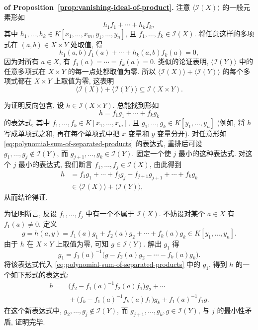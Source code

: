 \begin{Proof}\textbf{of Proposition~\ref{prop:vanishing-ideal-of-product}.}\quad
注意 $\langle\mathcal{I}(X)\rangle$ 的一般元素形如
\[
  h_{1}f_{1}+\cdots+h_{k}f_{k},
\]
其中 $h_{1},\ldots,h_{k}\in K[x_{1},\ldots,x_{m},y_{1},\ldots,y_{n}]$, 且 $f_{1},\ldots,f_{k}\in\mathcal{I}(X)$. 将任意这样的多项式在 $(a,b)\in X\times Y$ 处取值, 得
\[
  h_{1}(a,b)f_{1}(a)+\cdots+h_{k}(a,b)f_{k}(a)=0,
\]
因为对所有 $a\in X$, 有 $f_{1}(a)=\cdots=f_{k}(a)=0$. 类似的论证表明, $\langle\mathcal{I}(Y)\rangle$ 中的任意多项式在 $X\times Y$ 的每一点处都取值为零. 所以 $\langle\mathcal{I}(X)\rangle+\langle\mathcal{I}(Y)\rangle$ 的每个多项式都在 $X\times Y$ 上取值为零, 这表明
\[
  \langle\mathcal{I}(X)\rangle+\langle\mathcal{I}(Y)\rangle\subseteq\mathcal{I}(X\times Y).
\]

为证明反向包含, 设 $h\in\mathcal{I}(X\times Y)$. 总能找到形如
\begin{equation}\label{eq:polynomial-sum-of-separated-products}
  h=f_{1}g_{1}+\cdots+f_{k}g_{k}
\end{equation}
的表达式, 其中 $f_{1},\ldots,f_{k}\in K[x_{1},\ldots,x_{m}]$, 且 $g_{1},\ldots,g_{k}\in K[y_{1},\ldots,y_{n}]$ (例如, 将 $h$ 写成单项式之和, 再在每个单项式中把 $x$ 变量和 $y$ 变量分开). 对任意形如 \eqref{eq:polynomial-sum-of-separated-products} 的表达式, 重排后可设 $g_{1},\ldots,g_{j}\notin\mathcal{I}(Y)$, 而 $g_{j+1},\ldots,g_{k}\in\mathcal{I}(Y)$. 固定一个使 $j$ 最小的这种表达式. 对这个 $j$ 最小的表达式, 我们断言 $f_{1},\ldots,f_{j}\in\mathcal{I}(X)$, 由此得到
\[
  \begin{aligned}
    h&=f_{1}g_{1}+\cdots+f_{j}g_{j}+f_{j+1}g_{j+1}+\cdots+f_{k}g_{k}\\
     &\in\langle\mathcal{I}(X)\rangle+\langle\mathcal{I}(Y)\rangle,
  \end{aligned}
\]
从而结论得证.

为证明断言, 反设 $f_{1},\ldots,f_{j}$ 中有一个不属于 $\mathcal{I}(X)$. 不妨设对某个 $a\in X$ 有 $f_{1}(a)\neq0$. 定义
\[
  g=h(a,y)=f_{1}(a)g_{1}+f_{2}(a)g_{2}+\cdots+f_{k}(a)g_{k}
    \in K[y_{1},\ldots,y_{n}].
\]
由于 $h$ 在 $X\times Y$ 上取值为零, 可知 $g\in\mathcal{I}(Y)$. 解出 $g_{1}$ 得
\[
  g_{1}=f_{1}(a)^{-1}\bigl(g-f_{2}(a)g_{2}-\cdots-f_{k}(a)g_{k}\bigr).
\]
将该表达式代入 \eqref{eq:polynomial-sum-of-separated-products} 中的 $g_{1}$, 得到 $h$ 的一个如下形式的表达式:
\[
  \begin{aligned}
    h={}&\bigl(f_{2}-f_{1}(a)^{-1}f_{2}(a)f_{1}\bigr)g_{2}+\cdots\\
        &{}+\bigl(f_{k}-f_{1}(a)^{-1}f_{k}(a)f_{1}\bigr)g_{k}+f_{1}(a)^{-1}f_{1}g.
  \end{aligned}
\]
在这个新表达式中, $g_{2},\ldots,g_{j}\notin\mathcal{I}(Y)$, 而 $g_{j+1},\ldots,g_{k},g\in\mathcal{I}(Y)$, 与 $j$ 的最小性矛盾, 证明完毕.
\end{Proof}

